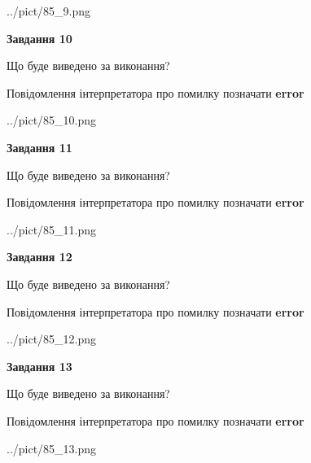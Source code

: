 \documentclass[11pt, ukrainian]{article}
\begin{document}
{\begin {large}
\begin{center}
	{../pict/85_9.png}
\end{center}
\newpage

{\begin {center}\textbf{Завдання 10}\end {center}}\par
Що буде виведено за виконання? \par
Повідомлення інтерпретатора про помилку позначати \textbf{error}

\begin{center}
	{../pict/85_10.png}
\end{center}
\newpage

{\begin {center}\textbf{Завдання 11}\end {center}}\par
Що буде виведено за виконання? \par
Повідомлення інтерпретатора про помилку позначати \textbf{error}

\begin{center}
	{../pict/85_11.png}
\end{center}
\newpage

{\begin {center}\textbf{Завдання 12}\end {center}}\par
Що буде виведено за виконання? \par
Повідомлення інтерпретатора про помилку позначати \textbf{error}

\begin{center}
	{../pict/85_12.png}
\end{center}
\newpage

{\begin {center}\textbf{Завдання 13}\end {center}}\par
Що буде виведено за виконання? \par
Повідомлення інтерпретатора про помилку позначати \textbf{error}

\begin{center}
	{../pict/85_13.png}
\end{center}
\newpage


\end{large}}
\end{document}
